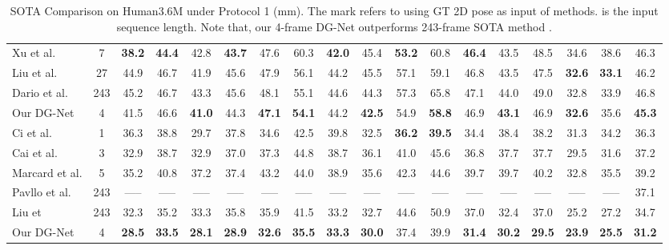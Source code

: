 \documentclass[journal]{IEEEtran}
\begin{document}
\begin{table*}[t]
\begin{center}
{\begin{tabular}{l| c | c |c |c |c |c |c |c |c |c |c |c |c |c |c |c |c}
Xu et al.\cite{Xu_2020_CVPR}
&7 &\textbf{38.2} &\textbf{44.4} &42.8&\textbf{43.7} &47.6 &60.3 &\textbf{42.0} &45.4 &\textbf{53.2} &60.8 &\textbf{46.4} &43.5 &48.5 &34.6 &38.6 &46.3 \\
Liu et al.\cite{liu2020gast} &27 &44.9&46.7 &41.9 &45.6 &47.9 &56.1 &44.2 &45.5 &57.1 &59.1 &46.8 &43.5 &47.5 &\textbf{32.6} &\textbf{33.1} &46.2\\
Dario et al.\cite{pavllo:videopose3d:2019}
& 243 &45.2      &46.7 &43.3  &45.6 &48.1 &55.1&44.6&44.3&57.3 &65.8&47.1&44.0&49.0&32.8 &33.9 &46.8\\
\hline
Our DG-Net			
& 4   &41.5    &46.6     &\textbf{41.0}&44.3&\textbf{47.1}&\textbf{54.1} &44.2&\textbf{42.5}&54.9 &\textbf{58.8}&46.9&\textbf{43.1}&46.9&\textbf{32.6} &35.6&\textbf{45.3}\\
\hline\hline

Ci et al.\cite{Ci_2019_ICCV}
& 1 &36.3    &38.8   &29.7    &37.8    &34.6    &42.5   &39.8  &32.5   &\textbf{36.2}   &\textbf{39.5}   &34.4  &38.4   &38.2  &31.3   &34.2   &36.3\\
Cai et al.\cite{Cai_2019_ICCV}
& 3  &32.9   &38.7  &32.9  &37.0   &37.3  &44.8  &38.7  &36.1   &41.0  &45.6   &36.8 &37.7  &37.7  &29.5  &31.6 &37.2\\
 Marcard et al.\cite{eccv2018temporal}
& 5   &35.2   &40.8 &37.2  &37.4   &43.2   &44.0  &38.9 &35.6   &42.3  &44.6   &39.7   &39.7 &40.2 &32.8 &35.5  &39.2\\
Pavllo et al.\cite{pavllo:videopose3d:2019}
& 243 &----- &----- &----- &-----  &----- &-----  &----- &----- &----- &-----  &----- &----- &----- &----- &----- &37.1\\
Liu et\cite{Liu_2020_CVPR}
&243 &32.3 &35.2&33.3&35.8 &35.9 &41.5 &33.2 &32.7 &44.6 &50.9 &37.0 &32.4 &37.0 &25.2 &27.2 &34.7\\
\hline
Our DG-Net
&4    &\textbf{28.5}   &\textbf{33.5}   &\textbf{28.1}   &\textbf{28.9}    &\textbf{32.6}   &\textbf{35.5}  &\textbf{33.3}  &\textbf{30.0}    &37.4  &39.9  &\textbf{31.4}   &\textbf{30.2}  &\textbf{29.5}   &\textbf{23.9} &\textbf{25.5} &\textbf{31.2}\\
\hline\hline			
\end{tabular}
}
\end{center}
\caption{SOTA Comparison on Human3.6M under Protocol 1 (mm).
The mark  refers to using GT 2D pose as input of methods.
 is the input sequence length.
Note that,
our 4-frame DG-Net outperforms 243-frame SOTA method \cite{pavllo:videopose3d:2019}.}
\label{protocol1}
\end{table*}
\end{document}
